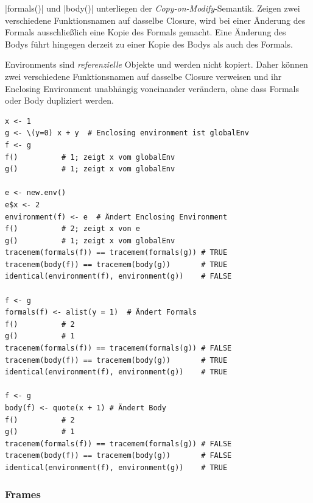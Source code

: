 \documentclass[10pt,twocolumn]{scrartcl}
\renewcommand{\lstinline}{\mycoloredinline}
\begin{document}
\lstinline|formals()| und \lstinline|body()| unterliegen der \emph{Copy-on-Modify}-Semantik. Zeigen zwei verschiedene Funktionsnamen auf dasselbe Closure, wird bei einer Änderung des Formals ausschließlich eine Kopie des Formals gemacht. Eine Änderung des Bodys führt hingegen derzeit zu einer Kopie des Bodys als auch des Formals.

Environments sind \emph{referenzielle} Objekte und werden nicht kopiert.
Daher können zwei verschiedene Funktionsnamen auf dasselbe Closure verweisen und ihr Enclosing Environment unabhängig voneinander verändern, ohne dass Formals oder Body dupliziert werden.


\begin{lstlisting}
x <- 1
g <- \(y=0) x + y  # Enclosing environment ist globalEnv
f <- g
f()          # 1; zeigt x vom globalEnv
g()          # 1; zeigt x vom globalEnv

e <- new.env()
e$x <- 2
environment(f) <- e  # Ändert Enclosing Environment
f()          # 2; zeigt x von e
g()          # 1; zeigt x vom globalEnv
tracemem(formals(f)) == tracemem(formals(g)) # TRUE
tracemem(body(f)) == tracemem(body(g))       # TRUE
identical(environment(f), environment(g))    # FALSE

f <- g
formals(f) <- alist(y = 1)  # Ändert Formals
f()          # 2
g()          # 1
tracemem(formals(f)) == tracemem(formals(g)) # FALSE
tracemem(body(f)) == tracemem(body(g))       # TRUE
identical(environment(f), environment(g))    # TRUE

f <- g
body(f) <- quote(x + 1) # Ändert Body
f()          # 2
g()          # 1
tracemem(formals(f)) == tracemem(formals(g)) # FALSE
tracemem(body(f)) == tracemem(body(g))       # FALSE
identical(environment(f), environment(g))    # TRUE
\end{lstlisting}


\subsubsection{Frames}
\end{document}
